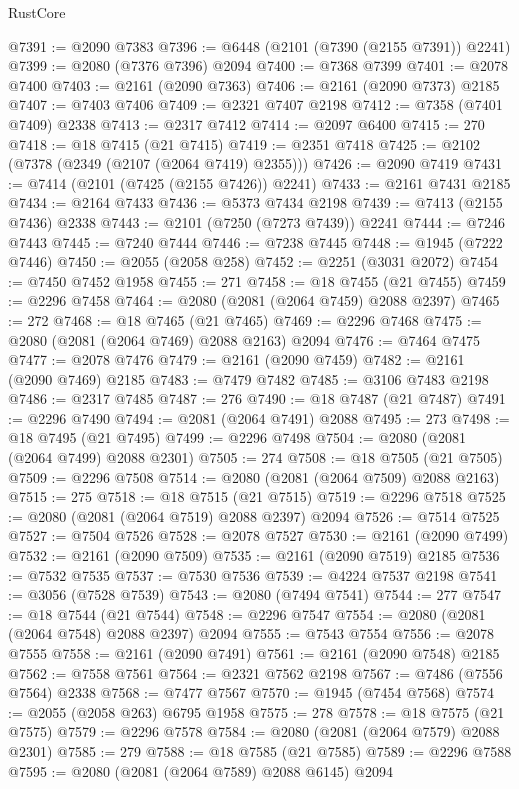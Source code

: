 \begin{lexlean}{RustCore}
\begin{coremodule}
@7391 := @2090 @7383
@7396 := @6448 (@2101 (@7390 (@2155 @7391)) @2241)
@7399 := @2080 (@7376 @7396) @2094
@7400 := @7368 @7399
@7401 := @2078 @7400
@7403 := @2161 (@2090 @7363)
@7406 := @2161 (@2090 @7373) @2185
@7407 := @7403 @7406
@7409 := @2321 @7407 @2198
@7412 := @7358 (@7401 @7409) @2338
@7413 := @2317 @7412
@7414 := @2097 @6400
@7415 := 270
@7418 := @18 @7415 (@21 @7415)
@7419 := @2351 @7418
@7425 := @2102 (@7378 (@2349 (@2107 (@2064 @7419) @2355)))
@7426 := @2090 @7419
@7431 := @7414 (@2101 (@7425 (@2155 @7426)) @2241)
@7433 := @2161 @7431 @2185
@7434 := @2164 @7433
@7436 := @5373 @7434 @2198
@7439 := @7413 (@2155 @7436) @2338
@7443 := @2101 (@7250 (@7273 @7439)) @2241
@7444 := @7246 @7443
@7445 := @7240 @7444
@7446 := @7238 @7445
@7448 := @1945 (@7222 @7446)
@7450 := @2055 (@2058 @258)
@7452 := @2251 (@3031 @2072)
@7454 := @7450 @7452 @1958
@7455 := 271
@7458 := @18 @7455 (@21 @7455)
@7459 := @2296 @7458
@7464 := @2080 (@2081 (@2064 @7459) @2088 @2397)
@7465 := 272
@7468 := @18 @7465 (@21 @7465)
@7469 := @2296 @7468
@7475 := @2080 (@2081 (@2064 @7469) @2088 @2163) @2094
@7476 := @7464 @7475
@7477 := @2078 @7476
@7479 := @2161 (@2090 @7459)
@7482 := @2161 (@2090 @7469) @2185
@7483 := @7479 @7482
@7485 := @3106 @7483 @2198
@7486 := @2317 @7485
@7487 := 276
@7490 := @18 @7487 (@21 @7487)
@7491 := @2296 @7490
@7494 := @2081 (@2064 @7491) @2088
@7495 := 273
@7498 := @18 @7495 (@21 @7495)
@7499 := @2296 @7498
@7504 := @2080 (@2081 (@2064 @7499) @2088 @2301)
@7505 := 274
@7508 := @18 @7505 (@21 @7505)
@7509 := @2296 @7508
@7514 := @2080 (@2081 (@2064 @7509) @2088 @2163)
@7515 := 275
@7518 := @18 @7515 (@21 @7515)
@7519 := @2296 @7518
@7525 := @2080 (@2081 (@2064 @7519) @2088 @2397) @2094
@7526 := @7514 @7525
@7527 := @7504 @7526
@7528 := @2078 @7527
@7530 := @2161 (@2090 @7499)
@7532 := @2161 (@2090 @7509)
@7535 := @2161 (@2090 @7519) @2185
@7536 := @7532 @7535
@7537 := @7530 @7536
@7539 := @4224 @7537 @2198
@7541 := @3056 (@7528 @7539)
@7543 := @2080 (@7494 @7541)
@7544 := 277
@7547 := @18 @7544 (@21 @7544)
@7548 := @2296 @7547
@7554 := @2080 (@2081 (@2064 @7548) @2088 @2397) @2094
@7555 := @7543 @7554
@7556 := @2078 @7555
@7558 := @2161 (@2090 @7491)
@7561 := @2161 (@2090 @7548) @2185
@7562 := @7558 @7561
@7564 := @2321 @7562 @2198
@7567 := @7486 (@7556 @7564) @2338
@7568 := @7477 @7567
@7570 := @1945 (@7454 @7568)
@7574 := @2055 (@2058 @263) @6795 @1958
@7575 := 278
@7578 := @18 @7575 (@21 @7575)
@7579 := @2296 @7578
@7584 := @2080 (@2081 (@2064 @7579) @2088 @2301)
@7585 := 279
@7588 := @18 @7585 (@21 @7585)
@7589 := @2296 @7588
@7595 := @2080 (@2081 (@2064 @7589) @2088 @6145) @2094

\end{coremodule}
\end{lexlean}
